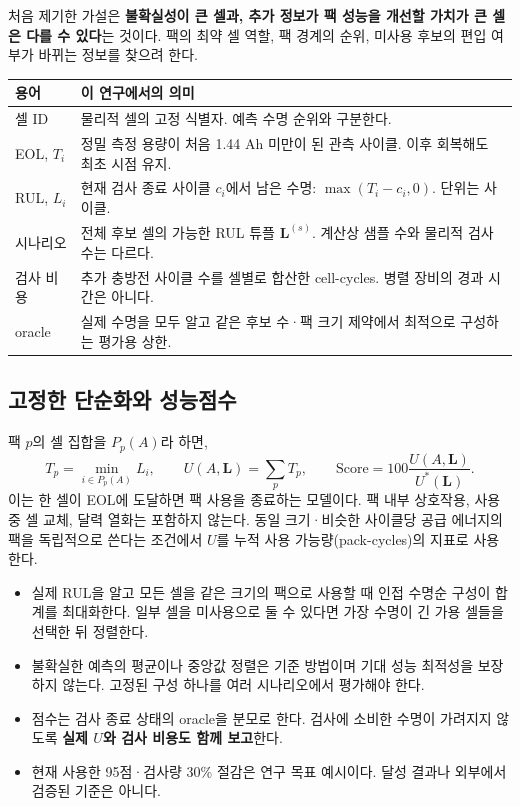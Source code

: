 \documentclass[11pt,a4paper]{article}
\begin{document}
처음 제기한 가설은 \textbf{불확실성이 큰 셀과, 추가 정보가 팩 성능을 개선할 가치가 큰 셀은 다를 수 있다}는 것이다. 팩의 최약 셀 역할, 팩 경계의 순위, 미사용 후보의 편입 여부가 바뀌는 정보를 찾으려 한다.

\begin{tabular}{p{.23\linewidth}p{.67\linewidth}}
\toprule
용어 & 이 연구에서의 의미 \\
\midrule
셀 ID & 물리적 셀의 고정 식별자. 예측 수명 순위와 구분한다. \\
EOL, $T_i$ & 정밀 측정 용량이 처음 1.44 Ah 미만이 된 관측 사이클. 이후 회복해도 최초 시점 유지. \\
RUL, $L_i$ & 현재 검사 종료 사이클 $c_i$에서 남은 수명: $\max(T_i-c_i,0)$. 단위는 사이클. \\
시나리오 & 전체 후보 셀의 가능한 RUL 튜플 $\mathbf L^{(s)}$. 계산상 샘플 수와 물리적 검사 수는 다르다. \\
검사 비용 & 추가 충방전 사이클 수를 셀별로 합산한 cell-cycles. 병렬 장비의 경과 시간은 아니다. \\
oracle & 실제 수명을 모두 알고 같은 후보 수·팩 크기 제약에서 최적으로 구성하는 평가용 상한. \\
\bottomrule
\end{tabular}

\subsection*{고정한 단순화와 성능점수}
팩 $p$의 셀 집합을 $P_p(A)$라 하면,
\[
T_p=\min_{i\in P_p(A)}L_i,\qquad
U(A,\mathbf L)=\sum_p T_p,\qquad
\mathrm{Score}=100\frac{U(A,\mathbf L)}{U^*(\mathbf L)}.
\]
이는 한 셀이 EOL에 도달하면 팩 사용을 종료하는 모델이다. 팩 내부 상호작용, 사용 중 셀 교체, 달력 열화는 포함하지 않는다. 동일 크기·비슷한 사이클당 공급 에너지의 팩을 독립적으로 쓴다는 조건에서 $U$를 누적 사용 가능량(pack-cycles)의 지표로 사용한다.

\begin{itemize}
\item 실제 RUL을 알고 모든 셀을 같은 크기의 팩으로 사용할 때 인접 수명순 구성이 합계를 최대화한다. 일부 셀을 미사용으로 둘 수 있다면 가장 수명이 긴 가용 셀들을 선택한 뒤 정렬한다.
\item 불확실한 예측의 평균이나 중앙값 정렬은 기준 방법이며 기대 성능 최적성을 보장하지 않는다. 고정된 구성 하나를 여러 시나리오에서 평가해야 한다.
\item 점수는 검사 종료 상태의 oracle을 분모로 한다. 검사에 소비한 수명이 가려지지 않도록 \textbf{실제 $U$와 검사 비용도 함께 보고}한다.
\item 현재 사용한 95점·검사량 30\% 절감은 연구 목표 예시이다. 달성 결과나 외부에서 검증된 기준은 아니다.
\end{itemize}
\end{document}
